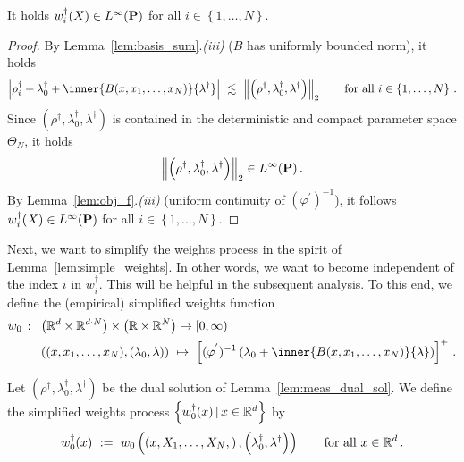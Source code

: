 \begin{lemma}
  \label{weights_l_inf}
  It holds
  $w_i^\dagger(X)\in L^\infty(\P)$
  for all $i\in \left\{ 1,\ldots,N \right\}$.
\end{lemma}
\begin{proof}
  By Lemma~\ref{lem:basis_sum}.\textit{(iii)} ($B$ has uniformly bounded norm),
  it holds
  \begin{align*}
  \left| 
    \rho_i^\dagger
    +
    \lambda_0^\dagger
    +
    \inner
    {B(x,x_1,\ldots,x_N)}
    {\lambda^\dagger}
  \right|
  \ 
  \lesssim
  \ 
  \norm{
\left( \rho^\dagger,\lambda_0^\dagger,\lambda^\dagger \right)
  }_2
  \qquad
  \text{for all}\ 
  i \in \left\{ 1,\ldots,N \right\}
  \,.
  \end{align*}
  Since
  $
\left( \rho^\dagger,\lambda_0^\dagger,\lambda^\dagger \right)
  $ is contained in the deterministic and compact parameter space $\Theta_N$,
  it holds
  \begin{align*}
  \norm{
\left( \rho^\dagger,\lambda_0^\dagger,\lambda^\dagger \right)
  }_2
  \in 
  L^{\infty}(\P)
  \,.
  \end{align*}
  By Lemma~\ref{lem:obj_f}.\textit{(iii)} 
  (uniform continuity of 
  $
  (\varphi^{'})^{-1}
  $), it follows 
  $w_i^\dagger(X)\in L^\infty(\P)$
  for all $i\in \left\{ 1,\ldots,N \right\}$.
\end{proof}
Next, we want to simplify the weights process in the spirit of Lemma~\ref{lem:simple_weights}.
In other words, we want to become independent of the index $i$ in $w_i^\dagger$. This will be helpful in the subsequent analysis.
To this end, we define the (empirical) simplified weights function
\begin{align*}
 w_0\ \colon\
 &
 \left( 
  \R^d\times \R^{d\cdot N}
 \right)
  \times
  \left( 
    \R\times \R^N
  \right)
  \to
  [0,\infty)
  \\
 &
  \left( 
  (x,x_1,\ldots,x_N),(\lambda_0,\lambda)
  \right)
  \ 
  \mapsto
  \ 
  \left[ 
  (\varphi^{'})^{-1}
  \left( 
    \lambda_0
    +
    \inner
    {B(x,x_1,\ldots,x_N)}
    {\lambda}
  \right)
\right]^+
\,.
\end{align*}
\begin{definition}
  Let 
  $
\left( \rho^\dagger,\lambda_0^\dagger,\lambda^\dagger \right)
  $
  be the dual solution of Lemma~\ref{lem:meas_dual_sol}.
  We define the simplified weights process 
  $\left\{ w_0^\dagger(x) \,|\, x\in\R^d\right\}$
  by
  \begin{align*}
    w_0^\dagger(x) 
    \ 
    :=
    \ 
    w_0
    \left( 
    \left( 
    x,X_1,\ldots,X_N,
    \right)
    ,
\left( \lambda_0^\dagger,\lambda^\dagger \right)
    \right)
    \qquad
    \text{for all}\ 
    x\in\R^d
    \,.
  \end{align*}
\end{definition}
